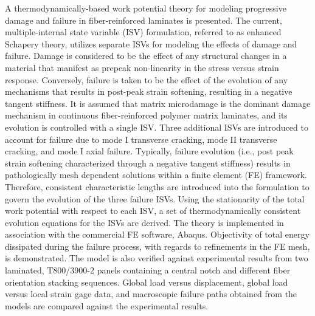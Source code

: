 A thermodynamically-based work potential theory for modeling progressive damage and failure in fiber-reinforced laminates is presented. The current, multiple-internal state variable (ISV) formulation, referred to as enhanced Schapery theory, utilizes separate ISVs for modeling the effects of damage and failure. Damage is considered to be the effect of any structural changes in a material that manifest as prepeak non-linearity in the stress versus strain response. Conversely, failure is taken to be the effect of the evolution of any mechanisms that results in post-peak strain softening, resulting in a negative tangent stiffness. It is assumed that matrix microdamage is the dominant damage mechanism in continuous fiber-reinforced polymer matrix laminates, and its evolution is controlled with a single ISV. Three additional ISVs are introduced to account for failure due to mode I transverse cracking, mode II transverse cracking, and mode I axial failure. Typically, failure evolution (i.e., post peak strain softening characterized through a negative tangent stiffness) results in pathologically mesh dependent solutions within a finite element (FE) framework. Therefore, consistent characteristic lengths are introduced into the formulation to govern the evolution of the three failure ISVs. Using the stationarity of the total work potential with respect to each ISV, a set of thermodynamically consistent evolution equations for the ISVs are derived. The theory is implemented in association with the commercial FE software, Abaqus. Objectivity of total energy dissipated during the failure process, with regards to refinements in the FE mesh, is demonstrated. The model is also verified against experimental results from two laminated, T800/3900-2 panels containing a central notch and different fiber orientation stacking sequences. Global load versus displacement, global load versus local strain gage data, and macroscopic failure paths obtained from the models are compared against the experimental results. ~\cite{hadden2015mechanical}

